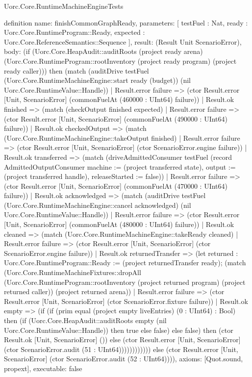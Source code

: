 \begin{lexlean}{Uorc.Core.RuntimeMachineEngineTests}
\begin{semanticmodule}
definition{
  name: finishCommonGraphReady,
  parameters: [
    testFuel : Nat,
    ready : Uorc.Core.RuntimeProgram::Ready,
    expected : Uorc.Core.ReferenceSemantics::Sequence
  ],
  result: (Result Unit ScenarioError),
  body: (if (Uorc.Core.HeapAudit::auditRoots (project ready arena) (Uorc.Core.RuntimeProgram::rootInventory (project ready program) (project ready caller))) then (match (auditDrive testFuel (Uorc.Core.RuntimeMachineEngine::start ready (budget)) (nil Uorc.Core.RuntimeValue::Handle))
    | Result.error failure => (ctor Result.error [Unit, ScenarioError] (commonFuelAt (460000 : UInt64) failure))
    | Result.ok finished => (match (checkOutput finished expected)
      | Result.error failure => (ctor Result.error [Unit, ScenarioError] (commonFuelAt (490000 : UInt64) failure))
      | Result.ok checkedOutput => (match (Uorc.Core.RuntimeMachineEngine::takeOutput finished)
        | Result.error failure => (ctor Result.error [Unit, ScenarioError] (ctor ScenarioError.engine failure))
        | Result.ok transferred => (match (driveAdmittedConsumer testFuel (record AdmittedOutputConsumer {machine := (project transferred state), output := (project transferred handle), releaseStarted := false}))
          | Result.error failure => (ctor Result.error [Unit, ScenarioError] (commonFuelAt (470000 : UInt64) failure))
          | Result.ok acknowledged => (match (auditDrive testFuel (Uorc.Core.RuntimeMachineEngine::cancel acknowledged) (nil Uorc.Core.RuntimeValue::Handle))
            | Result.error failure => (ctor Result.error [Unit, ScenarioError] (commonFuelAt (480000 : UInt64) failure))
            | Result.ok cleaned => (match (Uorc.Core.RuntimeMachineEngine::takeReady cleaned)
              | Result.error failure => (ctor Result.error [Unit, ScenarioError] (ctor ScenarioError.engine failure))
              | Result.ok returnedTransfer => (let returned : Uorc.Core.RuntimeProgram::Ready := (project returnedTransfer ready); (match (Uorc.Core.RuntimeMachineFixtures::dropAll (Uorc.Core.RuntimeProgram::rootInventory (project returned program) (project returned caller)) (project returned arena))
                | Result.error failure => (ctor Result.error [Unit, ScenarioError] (ctor ScenarioError.fixture failure))
                | Result.ok empty => (if (if (prim equal (project empty liveEntries) (0 : UInt64) : Bool) then (if (Uorc.Core.HeapAudit::auditRoots empty (nil Uorc.Core.RuntimeValue::Handle)) then true else false) else false) then (ctor Result.ok [Unit, ScenarioError] ()) else (ctor Result.error [Unit, ScenarioError] (ctor ScenarioError.audit (51 : UInt64)))))))))))) else (ctor Result.error [Unit, ScenarioError] (ctor ScenarioError.audit (52 : UInt64)))),
  axioms: [Quot.sound, propext],
  executable: false
}


\end{semanticmodule}
\end{lexlean}
